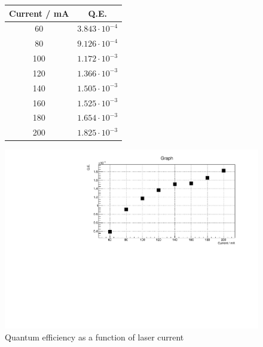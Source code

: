\documentclass[11pt,a4paper,notitlepage]{scrartcl}
\begin{document}
\begin{figure}

	
	\centering
	\begin{minipage}{.3\linewidth}
		\centering
		\begin{tabular}{cc}
			\toprule
			Current / mA & Q.E.      \\
			\hline
			60           & $3.843\cdot 10^{-4}$ \\
			80           & $9.126\cdot 10^{-4}$ \\
			100          & $1.172\cdot 10^{-3}$ \\
			120          & $1.366\cdot 10^{-3}$ \\
			140          & $1.505\cdot 10^{-3}$ \\
			160          & $1.525\cdot 10^{-3}$ \\
			180          & $1.654\cdot 10^{-3}$ \\
			200          & $1.825\cdot 10^{-3}$\\
			\bottomrule
		\end{tabular}

	\end{minipage}
	\begin{minipage}{.69\linewidth}
			\centering
			\includegraphics[width=\linewidth]{figs/measurements/qe.pdf}


	\end{minipage}
 \label{tab:qe}
\captionsetup{labelformat=andtable}
\caption{Quantum efficiency as a function of laser current}
\label{fig:qe}
\end{figure}
\end{document}
